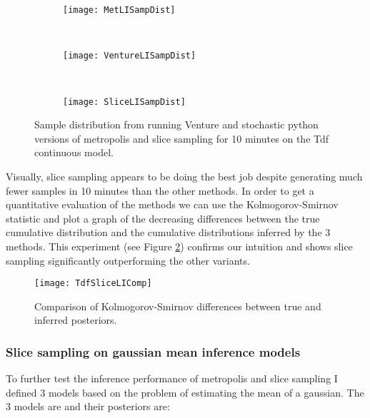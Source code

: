 \begin{figure}[h]
        \centering
        \begin{subfigure}[b]{0.31\textwidth}
                \centering
                \texttt{[image: MetLISampDist]}
        \end{subfigure}
        ~ 
        \begin{subfigure}[b]{0.31\textwidth}
                \centering
                \texttt{[image: VentureLISampDist]}
        \end{subfigure}
        ~ 
        \begin{subfigure}[b]{0.31\textwidth}
                \centering
                \texttt{[image: SliceLISampDist]}
        \end{subfigure}
    \caption{Sample distribution from running Venture and stochastic python versions of metropolis and slice sampling for 10 minutes on the Tdf continuous model.}
    \label{fig:tdfSampDists}
\end{figure}

Visually, slice sampling appears to be doing the best job despite generating much fewer samples in 10 minutes than the other methods. In order to get a quantitative evaluation of the methods we can use the Kolmogorov-Smirnov statistic and plot a graph of the decreasing differences between the true cumulative distribution and the cumulative distributions inferred by the 3 methods. This experiment (see Figure \ref{fig:TdfSliceLIComp}) confirms our intuition and shows slice sampling significantly outperforming the other variants. 

\begin{figure}[h]
    \centering
    \texttt{[image: TdfSliceLIComp]}
    \caption{Comparison of Kolmogorov-Smirnov differences between true and inferred posteriors.}
    \label{fig:TdfSliceLIComp}
\end{figure}

\subsubsection{Slice sampling on gaussian mean inference models}
To further test the inference performance of metropolis and slice sampling I defined 3 models based on the problem of estimating the mean of a gaussian. The 3 models are and their posteriors are:

